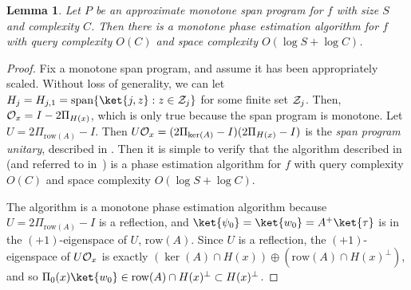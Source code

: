 \documentclass[11pt]{article}
\numberwithin{equation}{section}
\newtheorem{lemma}[theorem]{Lemma}
\theoremstyle{definition}
\theoremstyle{plain}
\begin{document}
\begin{lemma}\label{lem:monotone-span-to-alg}
Let $P$ be an approximate monotone span program for $f$ with size $S$ and complexity $C$. Then there is a monotone phase estimation algorithm for $f$ with query complexity $O(C)$ and space complexity $O(\log S+\log C)$. 
\end{lemma}
\begin{proof}
Fix a monotone span program, and assume it has been appropriately scaled. Without loss of generality, we can let $H_j=H_{j,1}=\mathrm{span}\{\ket{j,z}:z\in {\cal Z}_j\}$ for some finite set ${\cal Z}_j$.  Then, ${\cal O}_x=I-2\Pi_{H(x)}$, which is only true because the span program is monotone. 
Let $U=2\Pi_{\mathrm{row}(A)}-I$. Then $U{\cal O}_x = (2\Pi_{\ker(A)}-I)(2\Pi_{H(x)}-I)$ is the \emph{span program unitary}, described in . Then it is simple to verify that the algorithm described in \cite[Lemma 3.6]{IJ15} (and referred to in~) is a phase estimation algorithm for $f$ with query complexity $O(C)$ and space complexity $O(\log S+\log C)$.

The algorithm is a monotone phase estimation algorithm because $U=2\Pi_{\mathrm{row}(A)}-I$ is a reflection, and $\ket{\psi_0}=\ket{w_0}=A^+\ket{\tau}$ is in the $(+1)$-eigenspace of $U$, $\mathrm{row}(A)$. Since $U$ is a reflection, the $(+1)$-eigenspace of $U{\cal O}_x$ is exactly $(\ker(A)\cap H(x))\oplus (\mathrm{row}(A)\cap H(x)^\bot)$, and so $\Pi_0(x)\ket{w_0}\in\mathrm{row}(A)\cap H(x)^\bot\subset H(x)^\bot$.
\end{proof}
\end{document}
